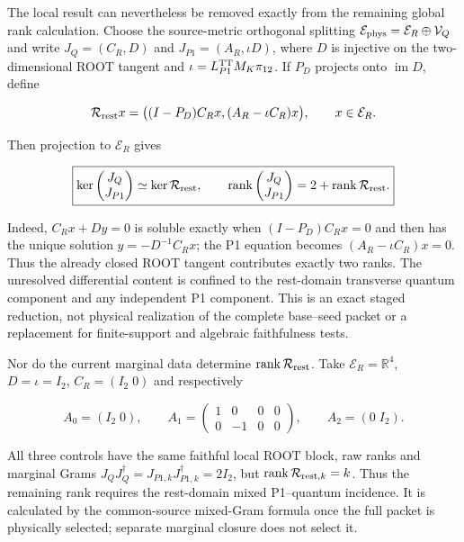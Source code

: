 The local result can nevertheless be removed exactly from the remaining
global rank calculation.  Choose the source-metric orthogonal splitting
$\mathcal E_{\rm phys}=\mathcal E_R\oplus\mathcal V_Q$ and write
$J_Q=(C_R,D)$ and $J_{P1}=(A_R,\iota D)$, where $D$ is injective on the
two-dimensional ROOT tangent and $\iota=L_{P1}^{\rm TT}M_K\pi_{12}$.
If $P_D$ projects onto $\operatorname{im}D$, define

\begin{equation}
\mathcal R_{\rm rest}x
=\bigl((I-P_D)C_Rx,(A_R-\iota C_R)x\bigr),
\qquad x\in\mathcal E_R.
\label{eq:stagedglue}
\end{equation}

Then projection to $\mathcal E_R$ gives

\begin{equation}
\boxed{
\ker\begin{pmatrix}J_Q\\J_{P1}\end{pmatrix}
\simeq\ker\mathcal R_{\rm rest},
\qquad
\operatorname{rank}\begin{pmatrix}J_Q\\J_{P1}\end{pmatrix}
=2+\operatorname{rank}\mathcal R_{\rm rest}.}
\label{eq:stagedgluerank}
\end{equation}

Indeed, $C_Rx+Dy=0$ is soluble exactly when
$(I-P_D)C_Rx=0$ and then has the unique solution
$y=-D^{-1}C_Rx$; the P1 equation becomes
$(A_R-\iota C_R)x=0$.  Thus the already closed ROOT tangent contributes
exactly two ranks.  The unresolved differential content is confined to the
rest-domain transverse quantum component and any independent P1 component.
This is an exact staged reduction, not physical realization of the complete
base--seed packet or a replacement for finite-support and algebraic
faithfulness tests.

Nor do the current marginal data determine
$\operatorname{rank}\mathcal R_{\rm rest}$. Take
$\mathcal E_R=\mathbb R^4$, $D=\iota=I_2$,
$C_R=(I_2\;0)$ and respectively

\begin{equation}
A_0=(I_2\;0),\qquad
A_1=\begin{pmatrix}1&0&0&0\\0&-1&0&0\end{pmatrix},\qquad
A_2=(0\;I_2).
\label{eq:restcontrols}
\end{equation}

All three controls have the same faithful local ROOT block, raw ranks and
marginal Grams $J_QJ_Q^\dagger=J_{P1,k}J_{P1,k}^\dagger=2I_2$, but
$\operatorname{rank}\mathcal R_{{\rm rest},k}=k$. Thus the remaining rank
requires the rest-domain mixed P1--quantum incidence. It is calculated by
the common-source mixed-Gram formula once the full packet is physically
selected; separate marginal closure does not select it.

